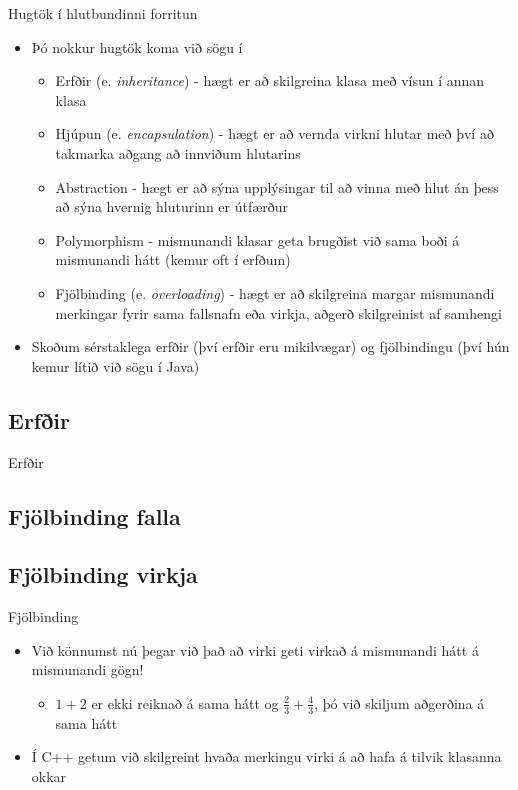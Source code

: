 \documentclass[handout]{beamer}
\begin{document}
\begin{frame}{Hugtök í hlutbundinni forritun}
\begin{itemize}
 \item Þó nokkur hugtök koma við sögu í 
 \begin{itemize}
  \item Erfðir (e. \emph{inheritance}) - hægt er að skilgreina klasa með vísun í annan klasa
  \item Hjúpun (e. \emph{encapsulation}) - hægt er að vernda virkni hlutar með því að takmarka aðgang að innviðum hlutarins
  \item Abstraction - hægt er að sýna upplýsingar til að vinna með hlut án þess að sýna hvernig hluturinn er útfærður
  \item Polymorphism - mismunandi klasar geta brugðist við sama boði á mismunandi hátt (kemur oft í erfðum)
  \item Fjölbinding (e. \emph{overloading}) - hægt er að skilgreina margar mismunandi merkingar fyrir sama fallsnafn eða virkja, aðgerð skilgreinist af samhengi
 \end{itemize}
 \item Skoðum sérstaklega erfðir (því erfðir eru mikilvægar) og fjölbindingu (því hún kemur lítið við sögu í Java)
\end{itemize}
\end{frame}

\subsection{Erfðir}

\begin{frame}{Erfðir}

\end{frame}

\subsection{Fjölbinding falla}

\subsection{Fjölbinding virkja}

\begin{frame}{Fjölbinding}
\begin{itemize}
 \item Við könnumst nú þegar við það að virki geti virkað á mismunandi hátt á mismunandi gögn!
 \begin{itemize}
  \item $1 + 2$ er ekki reiknað á sama hátt og $\frac{2}{3} + \frac{4}{3}$, þó við skiljum aðgerðina á sama hátt
 \end{itemize}
 \item Í C++ getum við skilgreint hvaða merkingu virki á að hafa á tilvik klasanna okkar
\end{itemize}
\end{frame}
\end{document}
